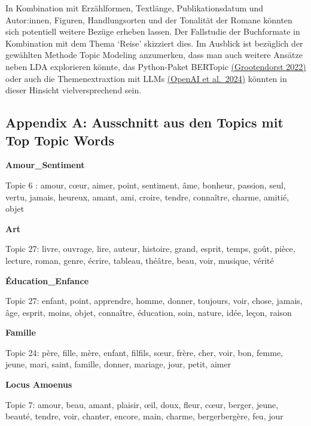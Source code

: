 \documentclass[
  12pt,
  letterpaper,
  DIV=11,
  numbers=noendperiod]{scrreprt}
\begin{document}
In Kombination mit Erzählformen, Textlänge, Publikationsdatum und
Autor:innen, Figuren, Handlungsorten und der Tonalität der Romane
könnten sich potentiell weitere Bezüge erheben lassen. Der Fallstudie
der Buchformate in Kombination mit dem Thema `Reise' skizziert dies. Im
Ausblick ist bezüglich der gewählten Methode Topic Modeling anzumerken,
dass man auch weitere Ansätze neben LDA explorieren könnte, das
Python-Paket BERTopic
\href{https://www.zotero.org/google-docs/?PjGTIL}{(Grootendorst 2022)}
oder auch die Themenextraxtion mit LLMs
\href{https://www.zotero.org/google-docs/?xGWMwK}{(OpenAI et al.~2024)}
könnten in dieser Hinsicht vielversprechend sein.

\subsection{}\label{section-2}

\subsection{Appendix A: Ausschnitt aus den Topics mit Top Topic
Words}\label{appendix-a-ausschnitt-aus-den-topics-mit-top-topic-words}

\textbf{Amour\_Sentiment}

Topic 6 : amour, cœur, aimer, point, sentiment, âme, bonheur, passion,
seul, vertu, jamais, heureux, amant, ami, croire, tendre, connaître,
charme, amitié, objet

\textbf{Art}

Topic 27: livre, ouvrage, lire, auteur, histoire, grand, esprit, temps,
goût, pièce, lecture, roman, genre, écrire, tableau, théâtre, beau,
voir, musique, vérité

\textbf{Éducation\_Enfance}

Topic 27: enfant, point, apprendre, homme, donner, toujours, voir,
chose, jamais, âge, esprit, moins, objet, connaître, éducation, soin,
nature, idée, leçon, raison

\textbf{Famille}

Topic 24: père, fille, mère, enfant, fil\textbar fils, sœur, frère,
cher, voir, bon, femme, jeune, mari, saint, famille, donner, mariage,
jour, petit, aimer

\textbf{Locus Amoenus}

Topic 7: amour, beau, amant, plaisir, œil, doux, fleur, cœur, berger,
jeune, beauté, tendre, voir, chanter, encore, main, charme,
berger\textbar bergère, feu, jour
\end{document}
